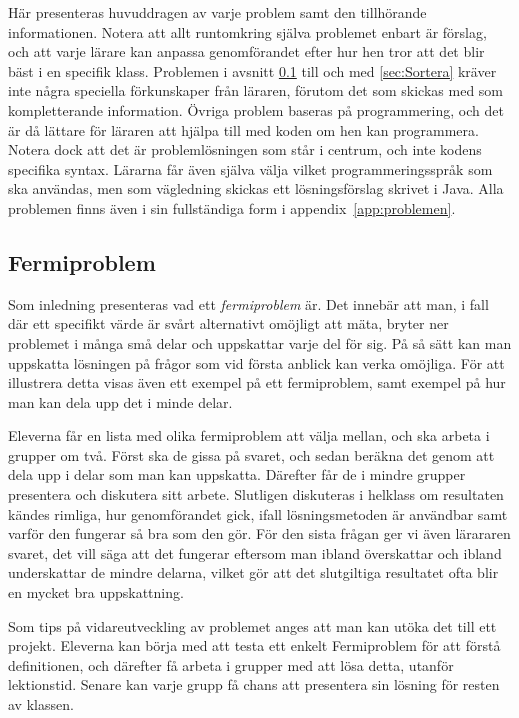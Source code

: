 \textcolor{lila}{Här presenteras huvuddragen av varje problem samt den tillhörande informationen. Notera att allt runtomkring själva problemet enbart är förslag, och att varje lärare kan anpassa genomförandet efter hur hen tror att det blir bäst i en specifik klass. Problemen i avsnitt \ref{sec:Fermi} till och med \ref{sec:Sortera} kräver inte några speciella förkunskaper från läraren, förutom det som skickas med som kompletterande information. Övriga problem baseras på programmering, och det är då lättare för läraren att hjälpa till med koden om hen kan programmera. Notera dock att det är problemlösningen som står i centrum, och inte kodens specifika syntax. Lärarna får även själva välja vilket programmeringsspråk som ska användas, men som vägledning skickas ett lösningsförslag skrivet i Java. Alla problemen finns även i sin fullständiga form i appendix~\ref{app:problemen}.}

\subsection{Fermiproblem}
    \label{sec:Fermi}
 
    \textcolor{lila}{Som inledning presenteras vad ett \textsl{fermiproblem} är. Det innebär att man, i fall där ett specifikt värde är svårt alternativt omöjligt att mäta, bryter ner problemet i många små delar och uppskattar varje del för sig. På så sätt kan man uppskatta lösningen på frågor som vid första anblick kan verka omöjliga. För att illustrera detta visas även ett exempel på ett fermiproblem, samt exempel på hur man kan dela upp det i minde delar.}

    \textcolor{lila}{Eleverna får en lista med olika fermiproblem att välja mellan, och ska arbeta i grupper om två. Först ska de gissa på svaret, och sedan beräkna det genom att dela upp i delar som man kan uppskatta. Därefter får de i mindre grupper presentera och diskutera sitt arbete. Slutligen diskuteras i helklass om resultaten kändes rimliga, hur genomförandet gick, ifall lösningsmetoden är användbar samt varför den fungerar så bra som den gör. För den sista frågan ger vi även lärararen svaret, det vill säga att det fungerar eftersom man ibland överskattar och ibland underskattar de mindre delarna, vilket gör att det slutgiltiga resultatet ofta blir en mycket bra uppskattning.}
    
    \textcolor{lila}{Som tips på vidareutveckling av problemet anges att man kan utöka det till ett projekt. Eleverna kan börja med att testa ett enkelt Fermiproblem för att förstå definitionen, och därefter få arbeta i grupper med att lösa detta, utanför lektionstid. Senare kan varje grupp få chans att presentera sin lösning för resten av klassen.}
    
